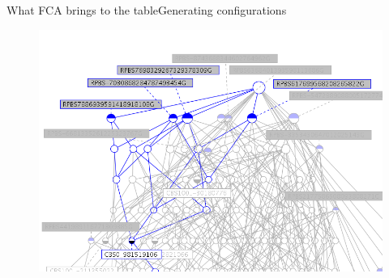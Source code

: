 \begin{frame}{What FCA brings to the table}{Generating configurations}
  \begin{figure}[ht]
    \begin{minipage}[t]{0.8\linewidth}
      \vspace{0pt}
      \centering
      \includegraphics[width=\textwidth]{img/fca/common_part}
    \end{minipage}
    \hfill
    \begin{minipage}[t]{0\linewidth}
    \end{minipage}
  \end{figure}
\end{frame}
